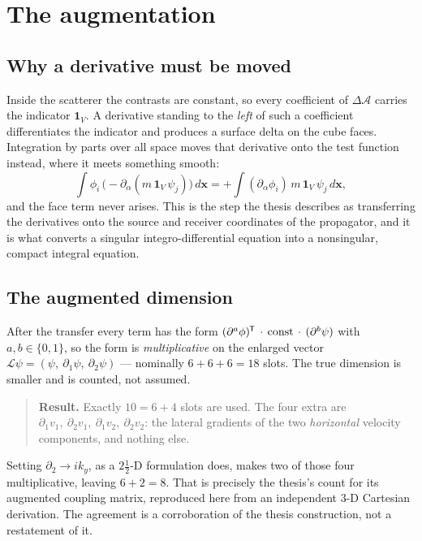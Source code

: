 \documentclass[11pt,a4paper]{article}
\newcommand{\dA}{\Delta\mathcal{A}}
\newcommand{\tp}{^{\mkern-1.5mu\mathsf{T}}}
\begin{document}
\section{The augmentation}

\subsection{Why a derivative must be moved}

Inside the scatterer the contrasts are constant, so every coefficient of $\dA$
carries the indicator $\mathbf{1}_V$.  A derivative standing to the \emph{left}
of such a coefficient differentiates the indicator and produces a surface delta
on the cube faces.  Integration by parts over all space moves that derivative
onto the test function instead, where it meets something smooth:
\begin{equation}\label{eq:byparts}
  \int \phi_i\,\bigl(-\partial_\alpha( m\,\mathbf{1}_V\,\psi_j)\bigr)\,d\mathbf{x}
  = +\int (\partial_\alpha\phi_i)\, m\,\mathbf{1}_V\,\psi_j\,d\mathbf{x},
\end{equation}
and the face term never arises.  This is the step the thesis describes as
transferring the derivatives onto the source and receiver coordinates of the
propagator, and it is what converts a singular integro-differential equation
into a nonsingular, compact integral equation.

\subsection{The augmented dimension}

After the transfer every term has the form
$(\partial^{a}\phi)\tp\,\cdot\,\text{const}\,\cdot\,(\partial^{b}\psi)$ with
$a,b\in\{0,1\}$, so the form is \emph{multiplicative} on the enlarged vector
$\mathcal{L}\psi = (\psi,\ \partial_1\psi,\ \partial_2\psi)$ --- nominally
$6+6+6 = 18$ slots.  The true dimension is smaller and is counted, not assumed.

\begin{quote}
\textbf{Result.}  Exactly $10 = 6+4$ slots are used.  The four extra are
$\partial_1 v_1,\ \partial_2 v_1,\ \partial_1 v_2,\ \partial_2 v_2$: the lateral
gradients of the two \emph{horizontal} velocity components, and nothing else.
\end{quote}

Setting $\partial_2 \to ik_y$, as a $2\tfrac12$-D formulation does, makes two of
those four multiplicative, leaving $6+2 = 8$.  That is precisely the thesis's
count for its augmented coupling matrix, reproduced here from an independent
$3$-D Cartesian derivation.  The agreement is a corroboration of the thesis
construction, not a restatement of it.
\end{document}
